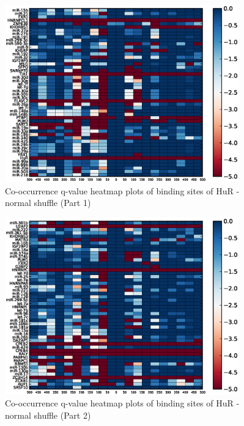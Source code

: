 \begin{figure}
   	\includegraphics[width=0.9\textwidth,clip]{appendix1/figures/HuR_normal_expressed_heatmap_qvalues0.eps}
   	\caption{Co-occurrence q-value heatmap plots of binding sites of HuR - normal shuffle (Part 1)}
\end{figure}
\clearpage
\begin{figure}
   	\includegraphics[width=0.9\textwidth]{appendix1/figures/HuR_normal_expressed_heatmap_qvalues1.eps}
   	\caption{Co-occurrence q-value heatmap plots of binding sites of HuR - normal shuffle (Part 2)}
\end{figure}

